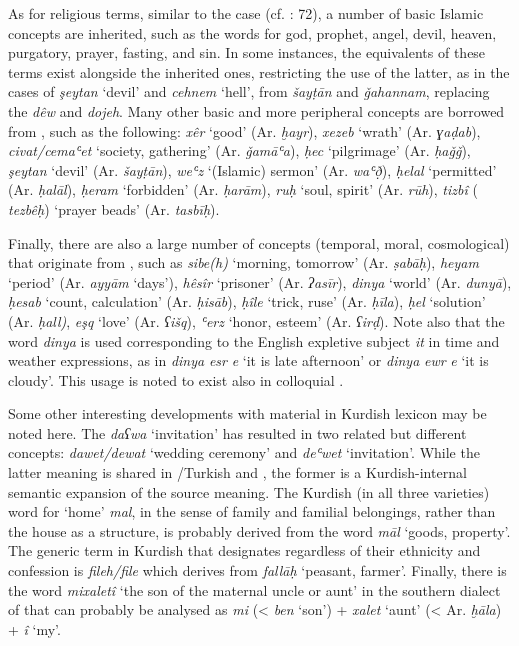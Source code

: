 \documentclass[output=paper]{langsci/langscibook}
\begin{document}
As for religious terms, similar to the  case (cf. \citealt{Perry2012}: 72), a number of basic Islamic concepts are inherited, such as the words for god, prophet, angel, devil, heaven, purgatory, prayer, fasting, and sin. In some instances, the  equivalents of these terms exist alongside the inherited ones, restricting the use of the latter, as in the cases of \textit{şeytan} ‘devil’ and \textit{cehnem} ‘hell’, from  \textit{šayṭān} and \textit{ǧahannam}, replacing the  \textit{dêw} and \textit{dojeh}. Many other basic and more peripheral concepts are borrowed from , such as the following: \textit{xêr} ‘good’ (Ar. \textit{ḫayr}), \textit{xezeb} ‘wrath’ (Ar. \textit{ɣaḍab}), \textit{civat/cemaʿet} ‘society, gathering’ (Ar. \textit{ǧamāʿa}), \textit{ḥec} ‘pilgrimage’ (Ar. \textit{ḥaǧǧ}), \textit{şeytan} ‘devil’ (Ar. \textit{šayṭān}), \textit{weʿz} ‘(Islamic) sermon’ (Ar. \textit{waʿð̣}), \textit{ḥelal} ‘permitted’ (Ar. \textit{ḥalāl}), \textit{ḥeram} ‘forbidden’ (Ar. \textit{ḥarām}), \textit{ruḥ} ‘soul, spirit’ (Ar. \textit{rūh}), \textit{tizbî} ( \textit{tezbêḥ}) ‘prayer beads’ (Ar. \textit{tasbīḥ}).  

Finally, there are also a large number of concepts (temporal, moral, cosmological) that originate from  , such as \textit{sibe(h)} ‘morning, tomorrow’ (Ar. \textit{ṣabāḥ}), \textit{heyam} ‘period’ (Ar. \textit{ayyām} ‘days’), \textit{hêsîr} ‘prisoner’ (Ar. \textit{ʔasīr}), \textit{dinya} ‘world’ (Ar. \textit{dunyā}), \textit{ḥesab} ‘count, calculation’ (Ar. \textit{ḥisāb}), \textit{ḥîle} ‘trick, ruse’ (Ar. \textit{ḥīla}), \textit{ḥel}  ‘solution’ (Ar. \textit{ḥall)}, \textit{eşq} ‘love’ (Ar. \textit{ʕišq}), \textit{ʿerz} ‘honor, esteem’ (Ar. \textit{ʕirḍ}). Note also that the word \textit{dinya} is used corresponding to the English expletive subject \textit{it} in time and weather expressions, as in \textit{dinya} \textit{esr} \textit{e} ‘it is late afternoon’ or \textit{dinya} \textit{ewr} \textit{e} ‘it is cloudy’. This usage is noted to exist also in colloquial  \citep[155]{Chyet2003}.

Some other interesting developments with  material in Kurdish lexicon may be noted here. The  \textit{daʕwa} ‘invitation’ has resulted in two related but different concepts: \textit{dawet/dewat} ‘wedding ceremony’ and \textit{deʿwet} ‘invitation’. While the latter meaning is shared in /{Turkish} and , the former is a Kurdish-internal semantic expansion of the source meaning. The Kurdish (in all three varieties) word for ‘home’ \textit{mal}, in the sense of family and familial belongings, rather than the house as a structure, is probably derived from the  word \textit{māl} ‘goods, property’. The generic term in Kurdish that designates  regardless of their ethnicity and confession is \textit{fileh/file} which derives from  \textit{fallāḥ} ‘peasant, farmer’. Finally, there is the word \textit{mixaletî} ‘the son of the maternal uncle or aunt’ in the southern  dialect of  that can probably be analysed as \textit{mi} (< \textit{ben} ‘son’) + \textit{xalet} ‘aunt’ (< Ar. \textit{ḫāla}) + \textit{î} ‘my’.
\end{document}
